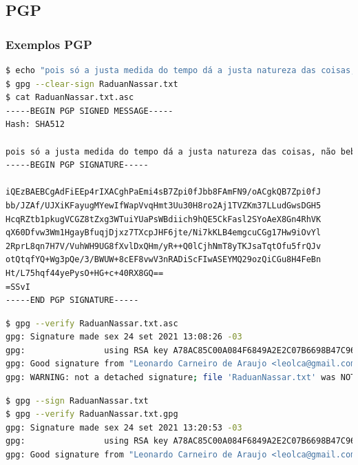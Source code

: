 \subsection{PGP}
\begin{frame}
\frametitle{Exemplos PGP}

\begin{lstlisting}[language=bash, label=lst-pgp-ex01, caption={Assinar um documento.}, postbreak=\mbox{$\hookrightarrow$\space}, basicstyle=\fontsize{8}{10}\selectfont\ttfamily]
$ echo "pois só a justa medida do tempo dá a justa natureza das coisas, não bebendo do vinho quem esvazia num só gole a taça cheia" > RaduanNassar.txt
$ gpg --clear-sign RaduanNassar.txt 
$ cat RaduanNassar.txt.asc
-----BEGIN PGP SIGNED MESSAGE-----
Hash: SHA512

pois só a justa medida do tempo dá a justa natureza das coisas, não bebendo do vinho quem esvazia num só gole a taça cheia
-----BEGIN PGP SIGNATURE-----

iQEzBAEBCgAdFiEEp4rIXACghPaEmi4sB7Zpi0fJbb8FAmFN9/oACgkQB7Zpi0fJ
bb/JZAf/UJXiKFayugMYewIfWapVvqHmt3Uu30H8ro2Aj1TVZKm37LLudGwsDGH5
HcqRZtb1pkugVCGZ8tZxg3WTuiYUaPsWBdiich9hQE5CkFasl2SYoAeX8Gn4RhVK
qX60Dfvw3Wm1HgayBfuqjDjxz7TXcpJHF6jte/Ni7kKLB4emgcuCGg17Hw9iOvYl
2RprL8qn7H7V/VuhWH9UG8fXvlDxQHm/yR++Q0lCjhNmT8yTKJsaTqtOfu5frQJv
otQtqfYQ+Wg3pQe/3/BWUW+8cEF8vwV3nRADiScFIwASEYMQ29ozQiCGu8H4FeBn
Ht/L75hqf44yePysO+HG+c+40RX8GQ==
=SSvI
-----END PGP SIGNATURE-----
\end{lstlisting}


\begin{lstlisting}[language=bash, label=lst-pgp-ex02, caption={Verificar a assinatura de um documento.}, postbreak=\mbox{$\hookrightarrow$\space}, basicstyle=\fontsize{8}{10}\selectfont\ttfamily]
$ gpg --verify RaduanNassar.txt.asc
gpg: Signature made sex 24 set 2021 13:08:26 -03
gpg:                using RSA key A78AC85C00A084F6849A2E2C07B6698B47C96DBF
gpg: Good signature from "Leonardo Carneiro de Araujo <leolca@gmail.com>" [ultimate]
gpg: WARNING: not a detached signature; file 'RaduanNassar.txt' was NOT verified!
\end{lstlisting}


\begin{lstlisting}[language=bash, label=lst-pgp-ex03, caption={Assinar um documento e verificar.}, postbreak=\mbox{$\hookrightarrow$\space}, basicstyle=\fontsize{8}{10}\selectfont\ttfamily]
$ gpg --sign RaduanNassar.txt
$ gpg --verify RaduanNassar.txt.gpg
gpg: Signature made sex 24 set 2021 13:20:53 -03
gpg:                using RSA key A78AC85C00A084F6849A2E2C07B6698B47C96DBF
gpg: Good signature from "Leonardo Carneiro de Araujo <leolca@gmail.com>" [ultimate]
\end{lstlisting}



\end{frame}

